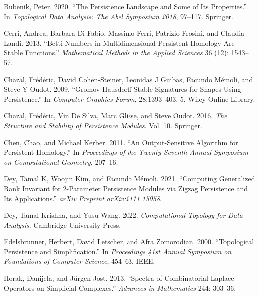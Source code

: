 \documentclass[
  letterpaper,
  DIV=11,
  numbers=noendperiod,
  oneside]{scrartcl}
\newlength{\cslhangindent}
\newlength{\cslentryspacingunit} %
\newenvironment{CSLReferences}[2] %
 {%
  \setlength{\parindent}{0pt}
  \ifodd #1
  \let\oldpar\par
  \def\par{\hangindent=\cslhangindent\oldpar}
  \fi
  \setlength{\parskip}{#2\cslentryspacingunit}
 }%
 {}
\begin{document}
\begin{CSLReferences}{1}{0}
\leavevmode{}%
Bubenik, Peter. 2020. {``The Persistence Landscape and Some of Its
Properties.''} In \emph{Topological Data Analysis: The Abel Symposium
2018}, 97--117. Springer.

\leavevmode{}%
Cerri, Andrea, Barbara Di Fabio, Massimo Ferri, Patrizio Frosini, and
Claudia Landi. 2013. {``Betti Numbers in Multidimensional Persistent
Homology Are Stable Functions.''} \emph{Mathematical Methods in the
Applied Sciences} 36 (12): 1543--57.

\leavevmode{}%
Chazal, Frédéric, David Cohen-Steiner, Leonidas J Guibas, Facundo
Mémoli, and Steve Y Oudot. 2009. {``Gromov-Hausdorff Stable Signatures
for Shapes Using Persistence.''} In \emph{Computer Graphics Forum},
28:1393--403. 5. Wiley Online Library.

\leavevmode{}%
Chazal, Frédéric, Vin De Silva, Marc Glisse, and Steve Oudot. 2016.
\emph{The Structure and Stability of Persistence Modules}. Vol. 10.
Springer.

\leavevmode{}%
Chen, Chao, and Michael Kerber. 2011. {``An Output-Sensitive Algorithm
for Persistent Homology.''} In \emph{Proceedings of the Twenty-Seventh
Annual Symposium on Computational Geometry}, 207--16.

\leavevmode{}%
Dey, Tamal K, Woojin Kim, and Facundo Mémoli. 2021. {``Computing
Generalized Rank Invariant for 2-Parameter Persistence Modules via
Zigzag Persistence and Its Applications.''} \emph{arXiv Preprint
arXiv:2111.15058}.

\leavevmode{}%
Dey, Tamal Krishna, and Yusu Wang. 2022. \emph{Computational Topology
for Data Analysis}. Cambridge University Press.

\leavevmode{}%
Edelsbrunner, Herbert, David Letscher, and Afra Zomorodian. 2000.
{``Topological Persistence and Simplification.''} In \emph{Proceedings
41st Annual Symposium on Foundations of Computer Science}, 454--63.
IEEE.

\leavevmode{}%
Horak, Danijela, and Jürgen Jost. 2013. {``Spectra of Combinatorial
Laplace Operators on Simplicial Complexes.''} \emph{Advances in
Mathematics} 244: 303--36.


\end{CSLReferences}
\end{document}
